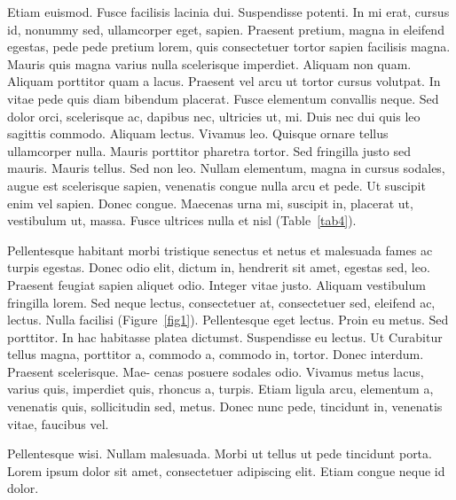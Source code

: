 \documentclass[ASNA,twocolumn]{USG} %
\begin{document}
{Etiam euismod. Fusce facilisis lacinia dui. Suspendisse potenti. In mi erat, cursus id, nonummy sed, ullamcorper
eget, sapien. Praesent pretium, magna in eleifend egestas, pede pede pretium lorem, quis consectetuer tortor sapien
facilisis magna. Mauris quis magna varius nulla scelerisque imperdiet. Aliquam non quam. Aliquam porttitor quam
a lacus. Praesent vel arcu ut tortor cursus volutpat. In vitae pede quis diam bibendum placerat. Fusce elementum
convallis neque. Sed dolor orci, scelerisque ac, dapibus nec, ultricies ut, mi. Duis nec dui quis leo sagittis commodo.
Aliquam lectus. Vivamus leo. Quisque ornare tellus ullamcorper nulla. Mauris porttitor pharetra tortor. Sed fringilla
justo sed mauris. Mauris tellus. Sed non leo. Nullam elementum, magna in cursus sodales, augue est scelerisque
sapien, venenatis congue nulla arcu et pede. Ut suscipit enim vel sapien. Donec congue. Maecenas urna mi, suscipit
in, placerat ut, vestibulum ut, massa. Fusce ultrices nulla et nisl (Table~\ref{tab4}).

Pellentesque habitant morbi tristique senectus et netus et malesuada fames ac turpis egestas. Donec odio elit,
dictum in, hendrerit sit amet, egestas sed, leo. Praesent feugiat sapien aliquet odio. Integer vitae justo. Aliquam
vestibulum fringilla lorem. Sed neque lectus, consectetuer at, consectetuer sed, eleifend ac, lectus. Nulla facilisi (Figure~\ref{fig1}).
Pellentesque eget lectus. Proin eu metus. Sed porttitor. In hac habitasse platea dictumst. Suspendisse eu lectus. Ut Curabitur tellus magna, porttitor a, commodo a, commodo in, tortor. Donec interdum. Praesent scelerisque. Mae-
cenas posuere sodales odio. Vivamus metus lacus, varius quis, imperdiet quis, rhoncus a, turpis. Etiam ligula arcu,
elementum a, venenatis quis, sollicitudin sed, metus. Donec nunc pede, tincidunt in, venenatis vitae, faucibus vel.



Pellentesque wisi. \cite{Kucharik2012} Nullam malesuada. Morbi ut tellus ut pede tincidunt porta. Lorem ipsum dolor sit amet,
consectetuer adipiscing elit. Etiam congue neque id dolor.


}
\end{document}
